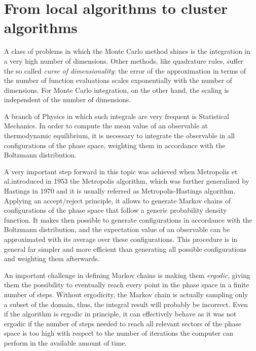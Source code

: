 \section*{From local algorithms to cluster algorithms}
A class of problems in which the Monte Carlo method shines is the integration in a very high number of dimensions.
Other methods, like quadrature rules, suffer the so called \emph{curse of dimensionality}:
the error of the approximation in terms of the number of function evaluations scales exponentially with the number of dimensions.
For Monte Carlo integration, on the other hand, the scaling is independent of the number of dimensions.

A branch of Physics in which such integrals are very frequent is Statistical Mechanics.
In order to compute the mean value of an observable at thermodynamic equilibrium,
it is necessary to integrate the observable in all configurations of the phase space, weighting them in accordance with the Boltzmann distribution.

A very important step forward in this topic was achieved when Metropolis et al.\@ introduced in 1953 \cite{metropolis:1953} the Metropolis algorithm,
which was further generalized by Hastings in 1970 \cite{hastings:1970} and it is usually referred as Metropolis-Hastings algorithm.
Applying an accept/reject principle, it allows to generate Markov chains of configurations of the phase space that follow a generic probability density function.
It makes then possible to generate configurations in accordance with the Boltzmann distribution,
and the expectation value of an observable can be approximated with its average over these configurations.
This procedure is in general far simpler and more efficient than generating all possible configurations and weighting them afterwards.

An important challenge in defining Markov chains is making them \emph{ergodic},
\ie giving them the possibility to eventually reach every point in the phase space in a finite number of steps.
Without ergodicity, the Markov chain is actually sampling only a subset of the domain, thus, the integral result will probably be incorrect.
Even if the algorithm is ergodic in principle,
it can effectively behave as it was not ergodic if the number of steps needed to reach all relevant sectors of the phase space is too high
with respect to the number of iterations the computer can perform in the available amount of time.

